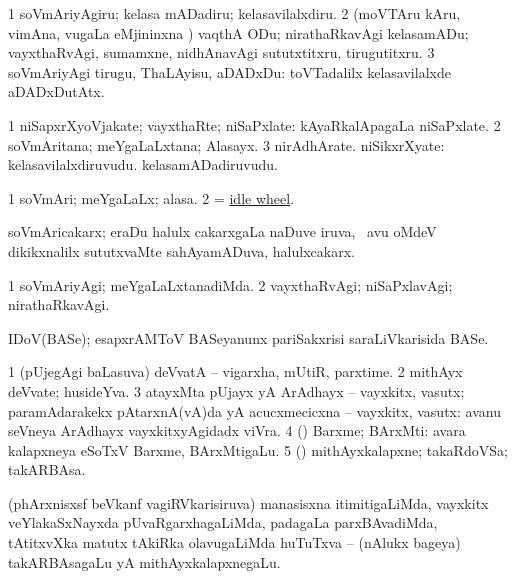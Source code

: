 \noindent
\gl{\akirx}
\bmng
\bnum
\num{1} soVmAriyAgiru; kelasa mADadiru; kelasavilalxdiru. 
\num{2} (moVTAru kAru, vimAna, \mo vugaLa eMjininxna \vi) vaqthA ODu; nirathaRkavAgi kelasamADu; vayxthaRvAgi, sumamxne, nidhAnavAgi sututxtitxru, tirugutitxru. 
\num{3} soVmAriyAgi tirugu, ThaLAyisu, aDADxDu:  toVTadalilx kelasavilalxde aDADxDutAtx. 
\enum
\emng
\eentry

\bentry
{}
\gl{\nA}
\bmng
\bnum
\num{1} niSapxrXyoVjakate; vayxthaRte; niSaPxlate:  kAyaRkalApagaLa niSaPxlate. 
\num{2} soVmAritana; meYgaLaLxtana; Alasayx. 
\num{3} nirAdhArate. 
 niSikxrXyate: 
\banum
{} kelasavilalxdiruvudu. 
 kelasamADadiruvudu. 
\eanum
\numie
\enum
\emng
\eentry

\bentry
{}
\gl{\nA}
\bmng
\bnum
\num{1} soVmAri; meYgaLaLx; alasa. 
\num{2}  = \hyperlink{idle wheel}{idle wheel}. 
\enum
\emng
\eentry

\bentry
{}
\gl{\nA}
\bmng
soVmAricakarx; eraDu halulx cakarxgaLa naDuve iruva, \kanmu\ avu oMdeV dikikxnalilx sututxvaMte sahAyamADuva, halulxcakarx.  
\emng
\eentry

\bentry
{}
\gl{\kirxvi}
\bmng
\bnum
\num{1} soVmAriyAgi; meYgaLaLxtanadiMda. 
\num{2} vayxthaRvAgi; niSaPxlavAgi; nirathaRkavAgi. 
\enum
\emng
\eentry

\bentry
{}
\gl{\nA}
\bmng
IDoV(BASe); esapxrAMToV BASeyanunx pariSakxrisi saraLiVkarisida BASe. 
\emng
\eentry

\bentry
{}
\gl{\nA}
\bmng
\bnum
\num{1} (pUjegAgi baLasuva) deVvatA -- vigarxha, mUtiR, parxtime. 
\num{2} mithAyx deVvate; husideYva. 
\num{3} atayxMta pUjayx yA ArAdhayx -- vayxkitx, vasutx; paramAdarakekx pAtarxnA(vA)da yA acucxmecicxna -- vayxkitx, vasutx:  avanu seVneya ArAdhayx vayxkitxyAgidadx viVra. 
\num{4} (\pArxparx) Barxme; BArxMti:  avara kalapxneya eSoTxV Barxme, BArxMtigaLu. 
\num{5} (\takaR) mithAyxkalapxne; takaRdoVSa; takARBAsa. 
\enum
\emng

\noindent
\gl{\pagu}
\bmng
{} 
 (phArxnisxsf beVkanf vagiRVkarisiruva) manasisxna itimitigaLiMda, vayxkitx veYlakaSxNayxda pUvaRgarxhagaLiMda, padagaLa parxBAvadiMda, tAtitxvXka matutx tAkiRka olavugaLiMda huTuTxva -- (nAlukx bageya) takARBAsagaLu yA mithAyxkalapxnegaLu. 
\emng
\eentry

